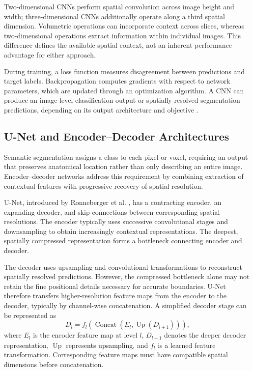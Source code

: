 Two-dimensional CNNs perform spatial convolution across image height and width; three-dimensional CNNs additionally operate along a third spatial dimension. Volumetric operations can incorporate context across slices, whereas two-dimensional operations extract information within individual images. This difference defines the available spatial context, not an inherent performance advantage for either approach.

During training, a loss function measures disagreement between predictions and target labels. Backpropagation computes gradients with respect to network parameters, which are updated through an optimization algorithm. A CNN can produce an image-level classification output or spatially resolved segmentation predictions, depending on its output architecture and objective \autocite{lecun2015deeplearning,litjens2017survey}.

\subsection{U-Net and Encoder--Decoder Architectures}

Semantic segmentation assigns a class to each pixel or voxel, requiring an output that preserves anatomical location rather than only describing an entire image. Encoder--decoder networks address this requirement by combining extraction of contextual features with progressive recovery of spatial resolution.

U-Net, introduced by Ronneberger et al. \autocite{ronneberger2015unet}, has a contracting encoder, an expanding decoder, and skip connections between corresponding spatial resolutions. The encoder typically uses successive convolutional stages and downsampling to obtain increasingly contextual representations. The deepest, spatially compressed representation forms a bottleneck connecting encoder and decoder.

The decoder uses upsampling and convolutional transformations to reconstruct spatially resolved predictions. However, the compressed bottleneck alone may not retain the fine positional details necessary for accurate boundaries. U-Net therefore transfers higher-resolution feature maps from the encoder to the decoder, typically by channel-wise concatenation. A simplified decoder stage can be represented as
\begin{equation}
D_l=f_l\left(\operatorname{Concat}\left(E_l,\operatorname{Up}(D_{l+1})\right)\right),
\end{equation}
where $E_l$ is the encoder feature map at level $l$, $D_{l+1}$ denotes the deeper decoder representation, $\operatorname{Up}$ represents upsampling, and $f_l$ is a learned feature transformation. Corresponding feature maps must have compatible spatial dimensions before concatenation.

